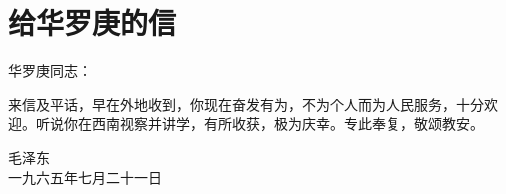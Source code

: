 \section[给华罗庚的信（一九六五年七月二十一日）]{给华罗庚的信}


华罗庚同志：

来信及平话，早在外地收到，你现在奋发有为，不为个人而为人民服务，十分欢迎。听说你在西南视察并讲学，有所收获，极为庆幸。专此奉复，敬颂教安。
{\raggedleft 毛泽东\\一九六五年七月二十一日\par}


